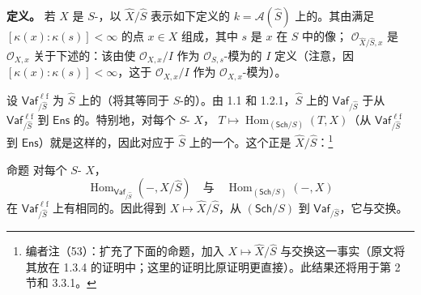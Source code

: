 \textbf{定义。} 若 $X$ 是 $S$-，以 $\widehat X/\widehat S$ 表示如下定义的 $k=\mathscr A(\widehat S)$ 上的。其由满足 $[\kappa(x):\kappa(s)]<\infty$ 的点 $x\in X$ 组成，其中 $s$ 是 $x$ 在 $S$ 中的像； $\mathcal O_{\widehat X/\widehat S,x}$ 是 $\mathcal O_{X,x}$ 关于下述的：该由使 $\mathcal O_{X,x}/I$ 作为 $\mathcal O_{S,s}$-模为的 $I$ 定义（注意，因 $[\kappa(x):\kappa(s)]<\infty$，这于 $\mathcal O_{X,x}/I$ 作为 $\mathcal O_{X,x}$-模为）。

设 $\mathsf{Vaf}^{\ell\mathrm f}_{/\widehat S}$ 为 $\widehat S$ 上的（将其等同于 $S$-的）。由 1.1 和 1.2.1，$\widehat S$ 上的 $\mathsf{Vaf}_{/\widehat S}$ 于从 $\mathsf{Vaf}^{\ell\mathrm f}_{/\widehat S}$ 到 $\mathsf{Ens}$ 的。特别地，对每个 $S$- $X$， $T\mapsto\operatorname{Hom}_{(\mathsf{Sch}/S)}(T,X)$（从 $\mathsf{Vaf}^{\ell\mathrm f}_{/\widehat S}$ 到 $\mathsf{Ens}$）就是这样的，因此对应于 $\widehat S$ 上的一个。这个正是 $\widehat X/\widehat S$：\footnote{编者注（53）：扩充了下面的命题，加入 $X\mapsto\widehat X/\widehat S$ 与交换这一事实（原文将其放在 1.3.4 的证明中；这里的证明比原证明更直接）。此结果还将用于第 2 节和 3.3.1。}
\begin{SGAresult}{命题}{}
对每个 $S$- $X$，
\[
 \operatorname{Hom}_{\mathsf{Vaf}_{/\widehat S}}(-,\widehat X/\widehat S)
 \quad\text{与}\quad\operatorname{Hom}_{(\mathsf{Sch}/S)}(-,X)
\]
在 $\mathsf{Vaf}^{\ell\mathrm f}_{/\widehat S}$ 上有相同的。因此得到 $X\mapsto\widehat X/\widehat S$，从 $(\mathsf{Sch}/S)$ 到 $\mathsf{Vaf}_{/\widehat S}$，它与交换。
\end{SGAresult}
